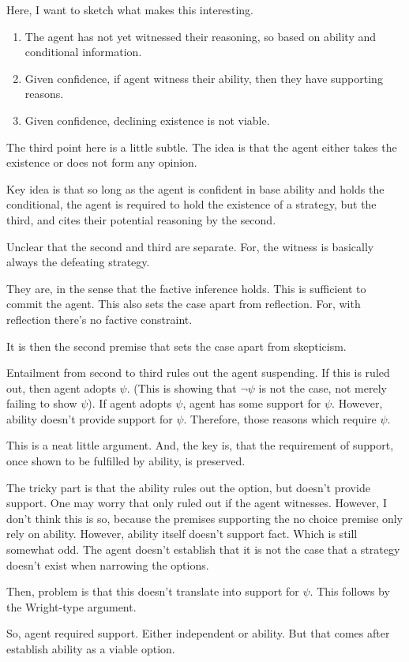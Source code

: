 \documentclass[10pt]{article}
\begin{document}
\begin{note}
  Here, I want to sketch what makes this interesting.

  \begin{enumerate}
  \item The agent has not yet witnessed their reasoning, so based on ability and conditional information.
  \item Given confidence, if agent witness their ability, then they have supporting reasons.
  \item Given confidence, declining existence is not viable.
  \end{enumerate}

  The third point here is a little subtle.
  The idea is that the agent either takes the existence or does not form any opinion.

  Key idea is that so long as the agent is confident in base ability and holds the conditional, the agent is required to hold the existence of a strategy, but the third, and cites their potential reasoning by the second.

  Unclear that the second and third are separate.
  For, the witness is basically always the defeating strategy.
  {
    \color{red}
    They are, in the sense that the factive inference holds.
    This is sufficient to commit the agent.
    This also sets the case apart from reflection.
    For, with reflection there's no factive constraint.

    It is then the second premise that sets the case apart from skepticism.
  }

  Entailment from second to third rules out the agent suspending.
  If this is ruled out, then agent adopts \(\psi\). (This is showing that \(\lnot\psi\) is not the case, not merely failing to show \(\psi\)).
  If agent adopts \(\psi\), agent has some support for \(\psi\).
  However, ability doesn't provide support for \(\psi\).
  Therefore, those reasons which require \(\psi\).

  This is a neat little argument.
  And, the key is, that the requirement of support, once shown to be fulfilled by ability, is preserved.

  The tricky part is that the ability rules out the option, but doesn't provide support.
  One may worry that only ruled out if the agent witnesses.
  However, I don't think this is so, because the premises supporting the no choice premise only rely on ability.
  However, ability itself doesn't support fact.
  Which is still somewhat odd.
  The agent doesn't establish that it is not the case that a strategy doesn't exist when narrowing the options.

  Then, problem is that this doesn't translate into support for \(\psi\).
  This follows by the Wright-type argument.

  So, agent required support.
  Either independent or ability.
  But that comes after establish ability as a viable option.
\end{note}
\end{document}
